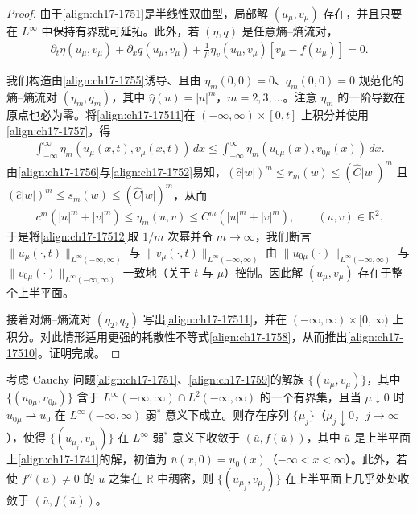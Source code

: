 \documentclass[../../main.tex]{subfiles}
\begin{document}
\begin{proof}
由于\eqref{align:ch17-1751}是半线性双曲型，局部解 $(u_\mu,v_\mu)$ 存在，并且只要在 $L^\infty$ 中保持有界就可延拓。此外，若 $(\eta,q)$ 是任意熵--熵流对，
\begin{align}
\partial_t\eta(u_\mu,v_\mu)+\partial_x q(u_\mu,v_\mu)+\frac{1}{\mu}\eta_v(u_\mu,v_\mu)[v_\mu-f(u_\mu)]=0.
\label{align:ch17-17511}
\end{align}

我们构造由\eqref{align:ch17-1755}诱导、且由 $\eta_m(0,0)=0$、$q_m(0,0)=0$ 规范化的熵--熵流对 $(\eta_m,q_m)$，其中 $\hat\eta(u)=|u|^m$，$m=2,3,\ldots$。注意 $\eta_m$ 的一阶导数在原点也必为零。将\eqref{align:ch17-17511}在 $(-\infty,\infty)\times[0,t]$ 上积分并使用\eqref{align:ch17-1757}，得
\begin{align}
\int_{-\infty}^\infty\eta_m(u_\mu(x,t),v_\mu(x,t))\,dx\leqslant\int_{-\infty}^\infty\eta_m(u_{0\mu}(x),v_{0\mu}(x))\,dx.
\label{align:ch17-17512}
\end{align}
由\eqref{align:ch17-1756}与\eqref{align:ch17-1752}易知，$(\hat c|w|)^m\leqslant r_m(w)\leqslant(\hat C|w|)^m$ 且 $(\hat c|w|)^m\leqslant s_m(w)\leqslant(\hat C|w|)^m$，从而
\begin{align}
c^m(|u|^m+|v|^m)\leqslant\eta_m(u,v)\leqslant C^m(|u|^m+|v|^m),\qquad(u,v)\in\mathbb{R}^2.
\label{align:ch17-17513}
\end{align}
于是将\eqref{align:ch17-17512}取 $1/m$ 次幂并令 $m\to\infty$，我们断言 $\|u_\mu(\cdot,t)\|_{L^\infty(-\infty,\infty)}$ 与 $\|v_\mu(\cdot,t)\|_{L^\infty(-\infty,\infty)}$ 由 $\|u_{0\mu}(\cdot)\|_{L^\infty(-\infty,\infty)}$ 与 $\|v_{0\mu}(\cdot)\|_{L^\infty(-\infty,\infty)}$ 一致地（关于 $t$ 与 $\mu$）控制。因此解 $(u_\mu,v_\mu)$ 存在于整个上半平面。

接着对熵--熵流对 $(\eta_2,q_2)$ 写出\eqref{align:ch17-17511}，并在 $(-\infty,\infty)\times[0,\infty)$ 上积分。对此情形适用更强的耗散性不等式\eqref{align:ch17-1758}，从而推出\eqref{align:ch17-17510}。证明完成。
\end{proof}

\begin{theorem}[松弛极限]\label{theorem:ch17-松弛极限}
考虑 Cauchy 问题\eqref{align:ch17-1751}、\eqref{align:ch17-1759}的解族 $\{(u_\mu,v_\mu)\}$，其中 $\{(u_{0\mu},v_{0\mu})\}$ 含于 $L^\infty(-\infty,\infty)\cap L^2(-\infty,\infty)$ 的一个有界集，且当 $\mu\downarrow0$ 时 $u_{0\mu}\rightharpoonup u_0$ 在 $L^\infty(-\infty,\infty)$ 弱$^*$ 意义下成立。则存在序列 $\{\mu_j\}$（$\mu_j\downarrow0$，$j\to\infty$），使得 $\{(u_{\mu_j},v_{\mu_j})\}$ 在 $L^\infty$ 弱$^*$ 意义下收敛于 $(\bar u,f(\bar u))$，其中 $\bar u$ 是上半平面上\eqref{align:ch17-1741}的解，初值为 $\bar u(x,0)=u_0(x)$（$-\infty<x<\infty$）。此外，若使 $f''(u)\neq0$ 的 $u$ 之集在 $\mathbb{R}$ 中稠密，则 $\{(u_{\mu_j},v_{\mu_j})\}$ 在上半平面上几乎处处收敛于 $(\bar u,f(\bar u))$。
\end{theorem}
\end{document}
